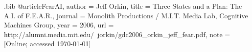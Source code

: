 \begin{filecontents*}{\jobname.bib}
@article{FearAI,
	author	= {Jeff Orkin},
	title		= {Three {S}tates and a {P}lan: The {A}.{I}. of {F.E.A.R.}},
	journal	= {Monolith Productions / M.I.T. Media Lab, Cognitive Machines Group},
	year		= {2006},
	url 		= {http://alumni.media.mit.edu/~jorkin/gdc2006\_orkin\_jeff\_fear.pdf},
	note		= {[Online; accessed \today]}
}
\end{filecontents*}


\nocite{*}

